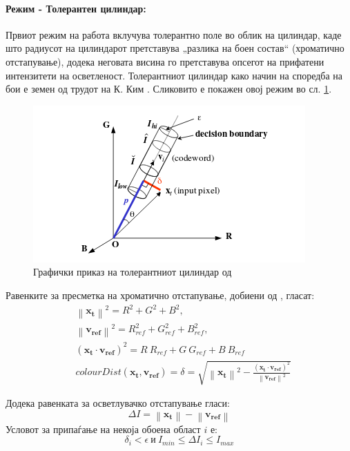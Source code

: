\documentclass[11pt]{article}
\newcommand\norm[1]{\left\lVert#1\right\rVert}
\renewcommand{\vec}[1]{\mathbf{#1}}
\begin{document}
      \paragraph{Режим - Толерантен цилиндар:\\}
        Првиот режим на работа вклучува толерантно поле во облик на цилиндар, каде што радиусот на цилиндарот претставува „разлика на боен состав“ (хроматично отстапување), додека неговата висина го претставува опсегот на прифатени интензитети на осветленост. Толерантниот цилиндар како начин на споредба на бои е земен од трудот на К. Ким \cite{kim}. Сликовито е покажен овој режим во сл. \ref{fig:cylinder}.
        \begin{figure}[h]
          \centering
          \includegraphics[width = 0.6\linewidth]{./images/cylinder.png}
          \caption{Графички приказ на толерантниот цилиндар од \cite{kim}}
          \label{fig:cylinder}
        \end{figure}
        Равенките за пресметка на хроматично отстапување, добиени од \cite{kim}, гласат:
        \begin{align}
        &  \norm{\vec{x_t}}^2 = R^2 + G^2 + B^2,\nonumber \\
        &  \norm{\vec{v_{ref}}}^2 = R_{ref}^2 + G_{ref}^2 + B_{ref}^2, \nonumber \\
        &    (\vec{x_t} \cdot \vec{v_{ref}})^2 = R\ R_{ref} + G\ G_{ref} + B\ B_{ref} \nonumber \\
        &    colourDist(\vec{x_t}, \vec{v_{ref}}) = \delta = \sqrt{\norm{\vec{x_t}}^2 - \frac{(\vec{x_t} \cdot \vec{v_{ref}})^2}{\norm{\vec{v_{ref}}}^2}}
        \end{align}
        \bigbreak

        Додека равенката за осветлувачко отстапување гласи:
        \begin{equation}
           \Delta I = \norm{\vec{x_t}} - \norm{\vec{v_{ref}}}
         \end{equation}
        \bigbreak
        Условот за припаѓање на некоја обоена област $i$ е:
        \begin{equation}
          \delta_{i} < \epsilon \ \text{и} \ I_{min} \leq \Delta I_i \leq I_{max}
        \end{equation}
\end{document}
